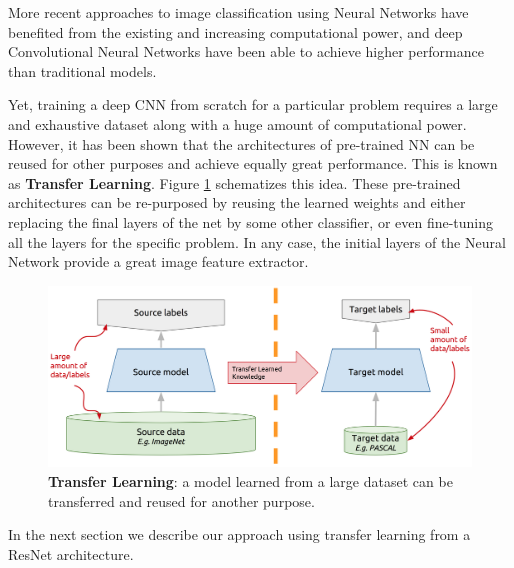 More recent approaches to image classification using Neural Networks have benefited from the existing and increasing computational power, and deep Convolutional Neural Networks have been able to achieve higher performance than traditional models. 

Yet, training a deep CNN from scratch for a particular problem requires a large and exhaustive dataset along with a huge amount of computational power. However, it has been shown that the architectures of pre-trained NN can be reused for other purposes and achieve equally great performance. This is known as \textbf{Transfer Learning}. Figure \ref{fig:transfer_learning_idea} schematizes this idea. These pre-trained architectures can be re-purposed by reusing the learned weights and either replacing the final layers of the net by some other classifier, or even fine-tuning all the layers for the specific problem. In any case, the initial layers of the Neural Network provide a great image feature extractor.

\begin{figure}[h!]
	\centering
	\captionsetup{width=1\linewidth}
	\includegraphics[width=1\textwidth]{Figures/transfer_learning_idea.png}
	\caption{\textbf{Transfer Learning}: a model learned from a large dataset can be transferred and reused for another purpose. \parencite{McGuinness2017}}
	\label{fig:transfer_learning_idea}
\end{figure}

In the next section we describe our approach using transfer learning from a ResNet architecture.




